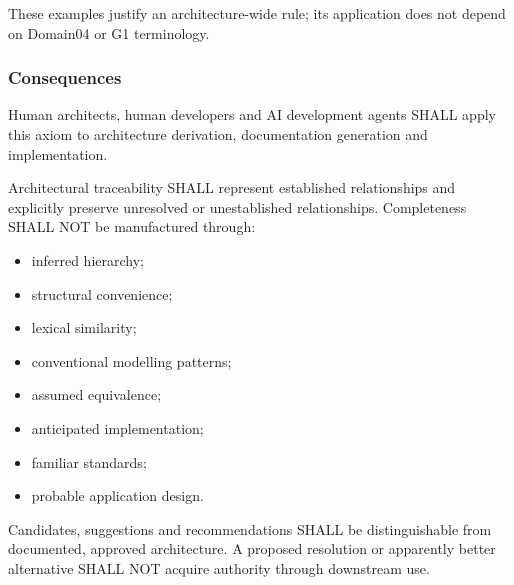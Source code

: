 These examples justify an architecture-wide rule; its application does not depend on Domain04 or G1 terminology.

\label{rad:axioms:822}
\subsubsection*{Consequences}
\label{rad:axioms:824}

Human architects, human developers and AI development agents SHALL apply this axiom to architecture derivation, documentation generation and implementation.

\label{rad:axioms:828}

Architectural traceability SHALL represent established relationships and explicitly preserve unresolved or unestablished relationships. Completeness SHALL NOT be manufactured through:

\label{rad:axioms:832}

\begin{itemize}

\item
inferred hierarchy;



\item
structural convenience;



\item
lexical similarity;



\item
conventional modelling patterns;



\item
assumed equivalence;



\item
anticipated implementation;



\item
familiar standards;



\item
probable application design.



\end{itemize}
\label{rad:axioms:841}

Candidates, suggestions and recommendations SHALL be distinguishable from documented, approved architecture. A proposed resolution or apparently better alternative SHALL NOT acquire authority through downstream use.

